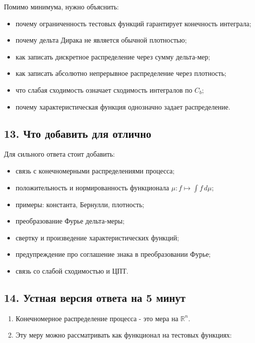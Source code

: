 \documentclass[
  11pt,
  a4paper,
]{article}
\providecommand{\tightlist}{%
  \setlength{\itemsep}{0pt}\setlength{\parskip}{0pt}}
\begin{document}
Помимо минимума, нужно объяснить:

\begin{itemize}
\tightlist
\item
  почему ограниченность тестовых функций гарантирует конечность
  интеграла;
\item
  почему дельта Дирака не является обычной плотностью;
\item
  как записать дискретное распределение через сумму дельта-мер;
\item
  как записать абсолютно непрерывное распределение через плотность;
\item
  что слабая сходимость означает сходимость интегралов по \(C_b\);
\item
  почему характеристическая функция однозначно задает распределение.
\end{itemize}

\subsection{13. Что добавить для
отлично}\label{ux447ux442ux43e-ux434ux43eux431ux430ux432ux438ux442ux44c-ux434ux43bux44f-ux43eux442ux43bux438ux447ux43dux43e}

Для сильного ответа стоит добавить:

\begin{itemize}
\tightlist
\item
  связь с конечномерными распределениями процесса;
\item
  положительность и нормированность функционала
  \(\mu:f\mapsto\int f\,d\mu\);
\item
  примеры: константа, Бернулли, плотность;
\item
  преобразование Фурье дельта-меры;
\item
  свертку и произведение характеристических функций;
\item
  предупреждение про соглашение знака в преобразовании Фурье;
\item
  связь со слабой сходимостью и ЦПТ.
\end{itemize}

\subsection{14. Устная версия ответа на 5
минут}\label{ux443ux441ux442ux43dux430ux44f-ux432ux435ux440ux441ux438ux44f-ux43eux442ux432ux435ux442ux430-ux43dux430-5-ux43cux438ux43dux443ux442}

\begin{enumerate}
\def\labelenumi{\arabic{enumi}.}
\tightlist
\item
  Конечномерное распределение процесса - это мера на \(\mathbb R^n\).
\item
  Эту меру можно рассматривать как функционал на тестовых функциях:
\end{enumerate}
\end{document}
